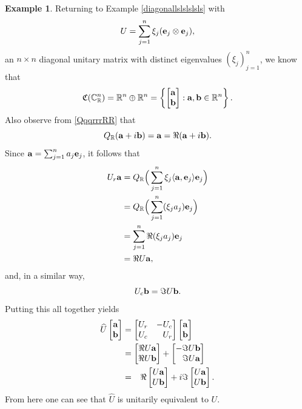 \documentclass{dis}
\newcommand{\phm}{\phantom{-}}
\theoremstyle{plain}
\theoremstyle{definition}
\newtheorem{Example}[equation]{Example}
\def\C{\mathbb{C}}
\def\R{\mathbb{R}}
\renewcommand{\vec}[1]{{\bf #1}}
\newcommand{\0}{{\color{lightgray}0}}
\begin{document}
\begin{Example}\label{UaUbbbb}
Returning to Example \ref{diagonallslslslsls} with 
$$U = \sum_{j = 1}^{n} \xi_j (\vec{e}_j \otimes \vec{e}_{j}),$$
an $n \times n$  diagonal unitary matrix with distinct eigenvalues $(\xi_j)_{j = 1}^{n}$,
we know that
$$\mathfrak{C}(\C^n_{\R}) = \R^n \oplus \R^n  = \left\{\begin{bmatrix} \vec{a} \\ \vec{b} \end{bmatrix}: \vec{a}, \vec{b} \in \R^n\right\}.$$
Also observe from \eqref{QqqrrrRR} that 
$$Q_{\R} (\vec{a} + i \vec{b}) = \vec{a} = \Re (\vec{a} + i \vec{b}).$$
Since $\vec{a} = \sum_{j = 1}^{n} a_j \vec{e}_j$, it follows that 
\begin{align*}
U_{r} \vec{a} & = Q_{\R} \Big(\sum_{j = 1}^{n} \xi_j \langle \vec{a}, \vec{e}_j\rangle \vec{e}_j\Big)\\
& = Q_{\R} \Big(\sum_{j = 1}^{n} (\xi_j a_j) \vec{e}_j\Big)\\
& = \sum_{j = 1}^{n} \Re (\xi_j a_j) \vec{e}_j\\
& = \Re U \vec{a},
\end{align*}
and, in a similar way, 
$$U_{c} \vec{b} = \Im U \vec{b}.$$
Putting this all together yields 
\begin{align*}
\widehat{U} \begin{bmatrix} \vec{a}\\ \vec{b}\end{bmatrix} & =  \begin{bmatrix}
U_r & - U_c\\
U_c &\phm U_r
\end{bmatrix} \begin{bmatrix} \vec{a}\\ \vec{b}\end{bmatrix} \\
&= \begin{bmatrix} \Re U \vec{a}\\ \Re U \vec{b}\end{bmatrix} + \begin{bmatrix}-\Im U \vec{b}\\ \phantom{-}\Im U \vec{a}\end{bmatrix}\\
 &= \phantom{-}\Re \begin{bmatrix} U \vec{a}\\ U \vec{b}\end{bmatrix} + i \Im  \begin{bmatrix} U \vec{a}\\ U \vec{b}\end{bmatrix}.
\end{align*}
From here one can see that $\widehat{U}$ is unitarily equivalent to $U$. 
\end{Example}
\end{document}
